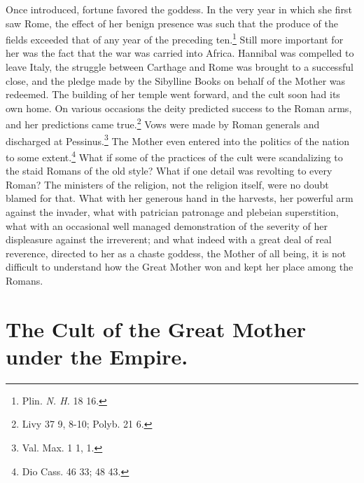 \documentclass[a4paper, 11pt, oneside, polutonikogreek, english]{article}
\begin{document}
Once introduced, fortune favored the goddess. In the very year in which she first saw Rome, the effect of her benign presence was such that the produce of the fields exceeded that of any year of the preceding ten.\footnote{Plin. \emph{N. H.} 18 16.} Still more important for her was the fact that the war was carried into Africa. Hannibal was compelled to leave Italy, the struggle between Carthage and Rome was brought to a successful close, and the pledge made by the Sibylline Books on behalf of the Mother was redeemed. The building of her temple went forward, and the cult soon had its own home. On various occasions the deity predicted success to the Roman arms, and her predictions came true.\footnote{Livy 37 9, 8-10; Polyb. 21 6.} Vows were made by Roman generals and discharged at Pessinus.\footnote{Val. Max. 1 1, 1.} The Mother even entered into the politics of the nation to some extent.\footnote{Dio Cass. 46 33; 48 43.} What if some of the practices of the cult were scandalizing to the staid Romans of the old style? What if one detail was revolting to every Roman? The ministers of the religion, not the religion itself, were no doubt blamed for that. What with her generous hand in the harvests, her powerful arm against the invader, what with patrician patronage and plebeian superstition, what with an occasional well managed demonstration of the severity of her displeasure against the irreverent; and what indeed with a great deal of real reverence, directed to her as a chaste goddess, the Mother of all being, it is not difficult to understand how the Great Mother won and kept her place among the Romans.
\clearpage
\section{The Cult of the Great Mother under the Empire.}
\end{document}
